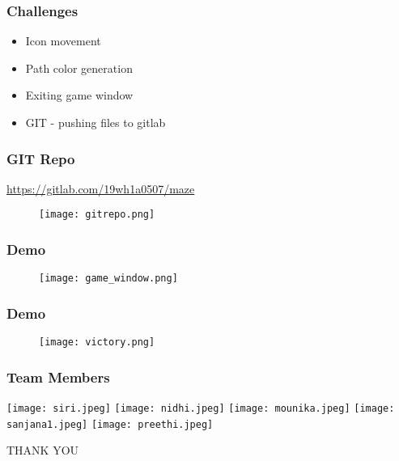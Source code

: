\documentclass[14pt]{beamer}
\begin{document}
    \begin{frame}
	\frametitle{Challenges}
        \begin{itemize}
	    \item Icon movement 
	    \item Path color generation 
	    \item Exiting game window 
	    \item GIT - pushing files to gitlab
        \end{itemize}
    \end{frame}
    \begin{frame}
	\frametitle{GIT Repo}
	    \url{https://gitlab.com/19wh1a0507/maze}
	\begin{figure}[htp]
                        \centering
                         \texttt{[image: gitrepo.png]}
                 \end{figure}
    \end{frame}
    \begin{frame}
	\frametitle{Demo}
	     \begin{figure}[htp]
                        \centering
                         \texttt{[image: game\_window.png]}
                 \end{figure}	
    \end{frame}
    \begin{frame}
	\frametitle{Demo}
	     \begin{figure}[htp]
                        \centering
                         \texttt{[image: victory.png]}
                 \end{figure}	
    \end{frame}
    \begin{frame}
	    \frametitle{Team Members}
	    \centering
            \texttt{[image: siri.jpeg]}
            \texttt{[image: nidhi.jpeg]}
            \texttt{[image: mounika.jpeg]} 
            \texttt{[image: sanjana1.jpeg]}
            \texttt{[image: preethi.jpeg]}
    \end{frame}
    \begin{frame}
	\begin{center}
	     THANK YOU
	\end{center}
    \end{frame}
\end{document}
